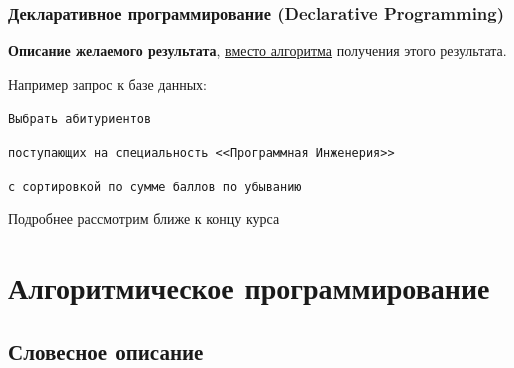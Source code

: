 {    \begin{frame}
      \frametitle{Декларативное программирование (Declarative Programming)}
      \textbf{Описание желаемого результата}, \underline{вместо алгоритма} получения этого результата.\linebreak
        \vspace{0.5cm}

        Например запрос к базе данных:

        \vspace{0.5cm}
        \texttt{Выбрать абитуриентов}

        \texttt{поступающих на специальность <<Программная Инженерия>>}

        \texttt{с сортировкой по сумме баллов по убыванию}
        \vspace{1cm}

        Подробнее рассмотрим ближе к концу курса
    \end{frame}


  \section{Алгоритмическое программирование}

    \frame {
      \begin{tikzpicture}
        \paradigmsAlg
      \end{tikzpicture}
    }

    \subsection{Словесное описание}

      }

